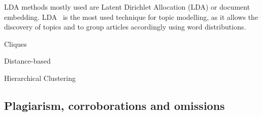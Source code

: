 LDA
methods mostly used are Latent Dirichlet Allocation (LDA) or document embedding.
LDA~\cite{blei2003latent} is the most used technique for topic modelling, as it allows the discovery of topics and to group articles accordingly using word distributions.

Cliques

Distance-based

Hierarchical Clustering







\subsection{Plagiarism, corroborations and omissions}

